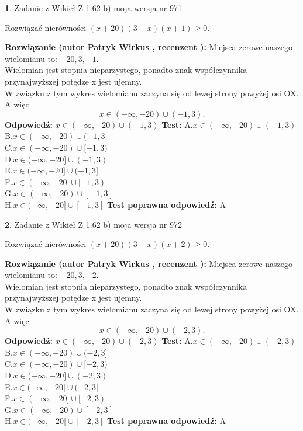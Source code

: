 \documentclass[12pt, a4paper]{article}
\theoremstyle{definition} %
\newtheorem{zad}{}
\newcommand{\zadStart}[1]{\begin{zad}#1\newline}
\newcommand{\zadStop}{\end{zad}}
\newcommand{\rozwStart}[2]{\noindent \textbf{Rozwiązanie (autor #1 , recenzent #2): }\newline}
\newcommand{\rozwStop}{\newline}
\newcommand{\odpStart}{\noindent \textbf{Odpowiedź:}\newline}
\newcommand{\odpStop}{\newline}
\newcommand{\testStart}{\noindent \textbf{Test:}\newline}
\newcommand{\testStop}{\newline}
\newcommand{\kluczStart}{\noindent \textbf{Test poprawna odpowiedź:}\newline}
\newcommand{\kluczStop}{\newline}
\begin{document}
\zadStart{Zadanie z Wikieł Z 1.62 b) moja wersja nr 971}

Rozwiązać nierówności $(x+20)(3-x)(x+1)\ge0$.
\zadStop
\rozwStart{Patryk Wirkus}{}
Miejsca zerowe naszego wielomianu to: $-20, 3, -1$.\\
Wielomian jest stopnia nieparzystego, ponadto znak współczynnika przy\linebreak najwyższej potędze x jest ujemny.\\ W związku z tym wykres wielomianu zaczyna się od lewej strony powyżej osi OX. A więc $$x \in (-\infty,-20) \cup (-1,3).$$
\rozwStop
\odpStart
$x \in (-\infty,-20) \cup (-1,3)$
\odpStop
\testStart
A.$x \in (-\infty,-20) \cup (-1,3)$\\
B.$x \in (-\infty,-20) \cup (-1,3]$\\
C.$x \in (-\infty,-20) \cup [-1,3)$\\
D.$x \in (-\infty,-20] \cup (-1,3)$\\
E.$x \in (-\infty,-20] \cup (-1,3]$\\
F.$x \in (-\infty,-20] \cup [-1,3)$\\
G.$x \in (-\infty,-20) \cup [-1,3]$\\
H.$x \in (-\infty,-20] \cup [-1,3]$
\testStop
\kluczStart
A
\kluczStop



\zadStart{Zadanie z Wikieł Z 1.62 b) moja wersja nr 972}

Rozwiązać nierówności $(x+20)(3-x)(x+2)\ge0$.
\zadStop
\rozwStart{Patryk Wirkus}{}
Miejsca zerowe naszego wielomianu to: $-20, 3, -2$.\\
Wielomian jest stopnia nieparzystego, ponadto znak współczynnika przy\linebreak najwyższej potędze x jest ujemny.\\ W związku z tym wykres wielomianu zaczyna się od lewej strony powyżej osi OX. A więc $$x \in (-\infty,-20) \cup (-2,3).$$
\rozwStop
\odpStart
$x \in (-\infty,-20) \cup (-2,3)$
\odpStop
\testStart
A.$x \in (-\infty,-20) \cup (-2,3)$\\
B.$x \in (-\infty,-20) \cup (-2,3]$\\
C.$x \in (-\infty,-20) \cup [-2,3)$\\
D.$x \in (-\infty,-20] \cup (-2,3)$\\
E.$x \in (-\infty,-20] \cup (-2,3]$\\
F.$x \in (-\infty,-20] \cup [-2,3)$\\
G.$x \in (-\infty,-20) \cup [-2,3]$\\
H.$x \in (-\infty,-20] \cup [-2,3]$
\testStop
\kluczStart
A
\kluczStop
\end{document}
